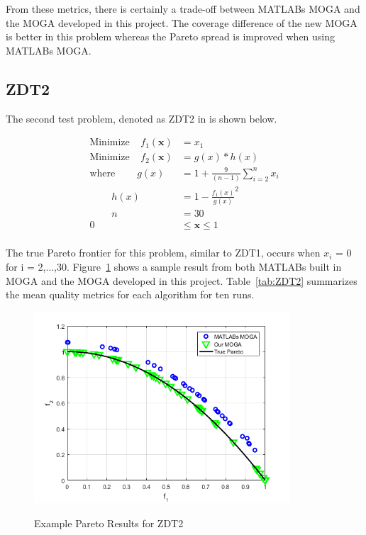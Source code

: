 \documentclass{article}
\begin{document}
\noindent From these metrics, there is certainly a trade-off between MATLABs MOGA and the MOGA developed in this project. The coverage difference of the new MOGA is better in this problem whereas the Pareto spread is improved when using MATLABs MOGA. 


\newpage
\subsection{ZDT2} 
The second test problem, denoted as ZDT2 in \cite{deb2001multi} is shown below. 


\begin{align*}
\textrm{Minimize} ~~~~~ f_1(\textbf{x}) &= x_1 \\
\textrm{Minimize} ~~~~~ f_2(\textbf{x}) &= g(x)*h(x) \\
\textrm{where} ~~~~~~~~~~ g(x) &= 1+\frac{9}{(n-1)}\sum_{i=2}^{n}x_i \\
~~~~~~~~~~ h(x) &= 1- \frac{f_1(x)}{g(x)}^2 \\
~~~~~~~~~~ n &= 30 \\
0 &\leq  \textbf{x}  \leq 1 \\
\end{align*}

\noindent The true Pareto frontier for this problem, similar to ZDT1, occurs when $x_i$ = 0 for i = 2,...,30. Figure~\ref{fig:ZDT2} shows a sample result from both MATLABs built in MOGA and the MOGA developed in this project. Table~\ref{tab:ZDT2} summarizes the mean quality metrics for each algorithm for ten runs.
\begin{figure}[H]
  \caption{Example Pareto Results for ZDT2}
  \centering
  \includegraphics[width=0.85\textwidth]{ZDT2_pareto_final.png}  
  \label{fig:ZDT2}
\end{figure}
\end{document}
